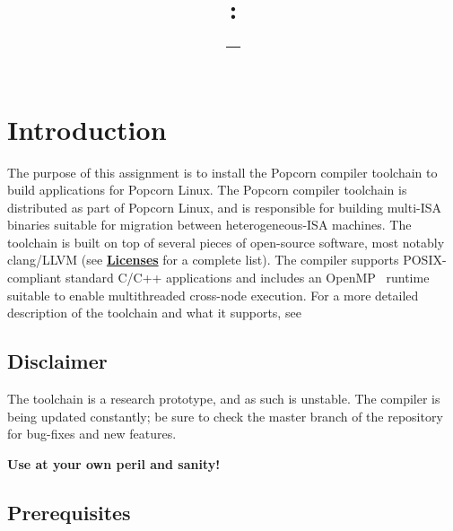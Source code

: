 \documentclass{article}
\title{
\vspace{2in}
\textmd{\textbf{\hmwkClass:\\ \hmwkNumber -- \hmwkTitle}}\\
\vspace{3in}
}
\begin{document}
\maketitle



\newpage
\tableofcontents
\newpage


\section{Introduction}

The purpose of this assignment is to install the Popcorn compiler toolchain to build applications for Popcorn Linux.  The Popcorn compiler toolchain is distributed as part of Popcorn Linux, and is responsible for building multi-ISA binaries suitable for migration between heterogeneous-ISA machines.  The toolchain is built on top of several pieces of open-source software, most notably clang/LLVM (see \hyperref[s:licenses]{\textbf{Licenses}} for a complete list).  The compiler supports POSIX-compliant standard C/C++ applications and includes an OpenMP~\cite{openmp} runtime suitable to enable multithreaded cross-node execution.  For a more detailed description of the toolchain and what it supports, see~\cite{lyerly2016popcorn,Barbalace:2017:BBH:3037697.3037738}

\subsection{Disclaimer}

The toolchain is a research prototype, and as such is unstable.  The compiler is being updated constantly; be sure to check the master branch of the repository for bug-fixes and new features.

\textbf{Use at your own peril and sanity!}

\subsection{Prerequisites}
\end{document}
